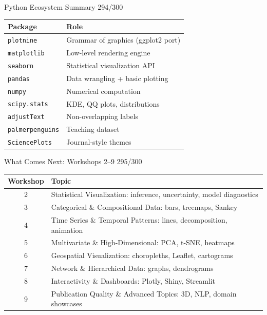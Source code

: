 \documentclass[10pt]{beamer}
\newcommand{\smark}[1]{\hfill{\scriptsize\color{codegray}#1}}
\begin{document}
\begin{frame}{Python Ecosystem Summary}
\smark{294/300}
\centering\small
\begin{tabular}{@{}ll@{}}
    \toprule
    \textbf{Package} & \textbf{Role} \\
    \midrule
    \texttt{plotnine}        & Grammar of graphics (ggplot2 port) \\
    \texttt{matplotlib}      & Low-level rendering engine \\
    \texttt{seaborn}         & Statistical visualization API \\
    \texttt{pandas}          & Data wrangling + basic plotting \\
    \texttt{numpy}           & Numerical computation \\
    \texttt{scipy.stats}     & KDE, QQ plots, distributions \\
    \texttt{adjustText}      & Non-overlapping labels \\
    \texttt{palmerpenguins}  & Teaching dataset \\
    \texttt{SciencePlots}    & Journal-style themes \\
    \bottomrule
\end{tabular}
\end{frame}

\begin{frame}{What Comes Next: Workshops 2--9}
\smark{295/300}
\centering\small
\begin{tabular}{@{}cl@{}}
    \toprule
    \textbf{Workshop} & \textbf{Topic} \\
    \midrule
    2 & Statistical Visualization: inference, uncertainty, model diagnostics \\
    3 & Categorical \& Compositional Data: bars, treemaps, Sankey \\
    4 & Time Series \& Temporal Patterns: lines, decomposition, animation \\
    5 & Multivariate \& High-Dimensional: PCA, t-SNE, heatmaps \\
    6 & Geospatial Visualization: choropleths, Leaflet, cartograms \\
    7 & Network \& Hierarchical Data: graphs, dendrograms \\
    8 & Interactivity \& Dashboards: Plotly, Shiny, Streamlit \\
    9 & Publication Quality \& Advanced Topics: 3D, NLP, domain showcases \\
    \bottomrule
\end{tabular}
\end{frame}
\end{document}
